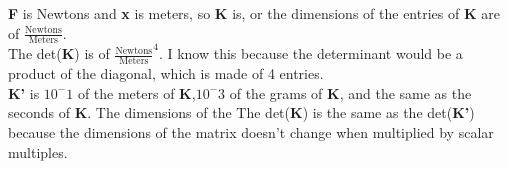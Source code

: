 \documentclass[12pt]{article}
\begin{document}
\textbf{F} is Newtons and \textbf{x} is meters, so \textbf{K} is, or the dimensions of the entries of \textbf{K} are of $\frac{\text{Newtons}}{\text{Meters}}$.   \\

The det(\textbf{K}) is of $\frac{\text{Newtons}}{\text{Meters}}^4$.  I know this because the determinant would be a product of the diagonal, which is made of 4 entries. \\

\textbf{K'} is $10^-1$ of the meters of \textbf{K},$10^-3$ of the grams of \textbf{K}, and the same as the seconds of \textbf{K}. The dimensions of the The det(\textbf{K}) is the same as the det(\textbf{K'}) because the dimensions of the matrix doesn't change when multiplied by scalar multiples.
\end{document}
